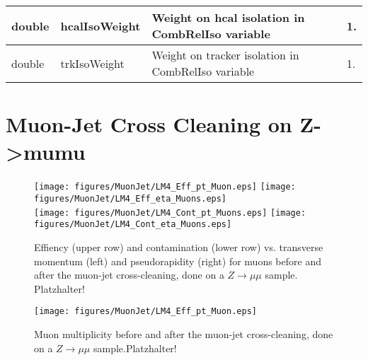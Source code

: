 \documentclass{cmspaper}
\begin{document}
\begin{appendix}
\begin{table}[h]
\begin{center}
\begin{tabular}{l|l|l|l}
    double & hcalIsoWeight   & 
    \begin{minipage}[t]{8cm}
      Weight on hcal isolation in CombRelIso variable
    \end{minipage}                                            & 1.\\\hline
    double & trkIsoWeight    & 
    \begin{minipage}[t]{8cm}
      Weight on tracker isolation in CombRelIso variable
    \end{minipage}                                            & 1.\\\hline
\end{tabular}
\end{center}
\label{tab:MuonJetPar}
\end{table}

\clearpage
\section{Muon-Jet Cross Cleaning on Z->mumu}
\label{app:Zmumu}

\begin{figure}[hb]
\begin{center}
    \texttt{[image: figures/MuonJet/LM4\_Eff\_pt\_Muon.eps]}
    \texttt{[image: figures/MuonJet/LM4\_Eff\_eta\_Muons.eps]}\\
    \texttt{[image: figures/MuonJet/LM4\_Cont\_pt\_Muons.eps]}
    \texttt{[image: figures/MuonJet/LM4\_Cont\_eta\_Muons.eps]}
    \caption{Effiency (upper row) and contamination (lower row) vs. transverse
    momentum (left) and pseudorapidity (right) for muons before and after the
    muon-jet cross-cleaning, done on a \(Z\rightarrow\mu\mu\) sample.
    {\color{red}Platzhalter!}}
    \label{fig:effCont_muon_MuonJet_Zmumu}
\end{center}
\end{figure}

\begin{figure}[hb]
\begin{center}
    \texttt{[image: figures/MuonJet/LM4\_Eff\_pt\_Muon.eps]}
    \caption{Muon multiplicity before and after the muon-jet cross-cleaning,
    done on a \(Z\rightarrow\mu\mu\) sample.{\color{red}Platzhalter!}}
    \label{fig:muon_mult_MuonJet_Zmumu}
\end{center}
\end{figure}



\end{appendix}
\end{document}
